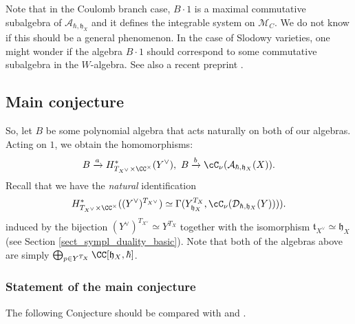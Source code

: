 \documentclass[12pt]{amsart}
\begin{document}
\begin{rmk}
Note that in the Coulomb branch case, $B \cdot 1$  is a maximal commutative subalgebra of $\mathcal{A}_{\hbar,\mathfrak{h}_X}$ and it defines the integrable system on $\mathcal{M}_C$. We do not know if this should be a general phenomenon. In the case of Slodowy varieties, one might wonder if the algebra $B \cdot 1$ should correspond to some commutative subalgebra in the $W$-algebra. See also a recent preprint \cite{Tu_integr_syst_min_nilp}.
\end{rmk}

\subsection{Main conjecture} 
So, let $B$ be some polynomial algebra that acts naturally on both of our algebras. Acting on $1$, we obtain the homomorphisms: 
\begin{equation*}
B \xrightarrow{a} H^*_{T_{X^\vee} \times \CC^\times}(Y^\vee),~ B \xrightarrow{b} \cC_\nu(\mathcal{A}_{\hbar,\mathfrak{h}_X}(X)).
\end{equation*}
Recall that we have the {\emph{natural}} identification 
\begin{equation*}
H^*_{T_{X^\vee} \times \CC^\times}((Y^\vee)^{T_{X^\vee}}) \simeq \Gamma(Y_{\mathfrak{h}_X}^{T_X},\cC_\nu(\mathcal{D}_{\hbar,\mathfrak{h}_X}(Y)))).
\end{equation*}
induced by the bijection $(Y^\vee)^{T_{X^\vee}} \simeq Y^{T_X}$ together with the isomorphism $\mathfrak{t}_{X^\vee} \simeq \mathfrak{h}_X$ (see Section \ref{sect_sympl_duality_basic}). 
Note that both of the algebras above are simply $\bigoplus_{p \in Y^{T_X}}\CC[\mathfrak{h}_{X},\hbar]$.

\subsubsection{Statement of the main conjecture}
The following Conjecture should be compared with \cite[Conjecture 5.26]{HKW} and \cite[Conjecrture 8.10]{KamnitzerTingleyWebsterWeeksYacobi}.
\end{document}
